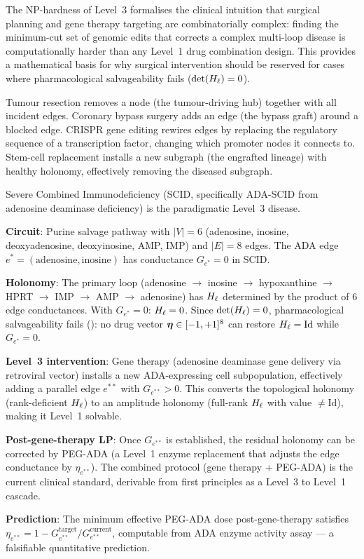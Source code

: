 \begin{remark}
The NP-hardness of Level~3 formalises the clinical intuition that surgical
planning and gene therapy targeting are combinatorially complex: finding the
minimum-cut set of genomic edits that corrects a complex multi-loop disease
is computationally harder than any Level~1 drug combination design.  This
provides a mathematical basis for why surgical intervention should be reserved
for cases where pharmacological salvageability fails ($\det(H_\ell) = 0$).
\end{remark}

\begin{remark}
Tumour resection removes a node (the tumour-driving hub) together with all
incident edges.  Coronary bypass surgery adds an edge (the bypass graft)
around a blocked edge.  CRISPR gene editing rewires edges by replacing the
regulatory sequence of a transcription factor, changing which promoter nodes
it connects to.  Stem-cell replacement installs a new subgraph (the engrafted
lineage) with healthy holonomy, effectively removing the diseased subgraph.
\end{remark}

\begin{example}
\label{ex:scid}
Severe Combined Immunodeficiency (SCID, specifically ADA-SCID from adenosine
deaminase deficiency) is the paradigmatic Level~3 disease.

\textbf{Circuit}: Purine salvage pathway with $|V| = 6$ (adenosine, inosine,
deoxyadenosine, deoxyinosine, AMP, IMP) and $|E| = 8$ edges.  The ADA edge
$e^* = (\mathrm{adenosine, inosine})$ has conductance $G_{e^*} = 0$ in
SCID.

\textbf{Holonomy}: The primary loop
(adenosine $\to$ inosine $\to$ hypoxanthine $\to$ HPRT $\to$ IMP $\to$ AMP
$\to$ adenosine) has $H_\ell$ determined by the product of 6 edge
conductances.  With $G_{e^*} = 0$: $H_\ell = 0$.  Since $\det(H_\ell) = 0$,
pharmacological salvageability fails (): no drug
vector $\boldsymbol{\eta} \in [-1,+1]^8$ can restore $H_\ell = \mathrm{Id}$ while
$G_{e^*} = 0$.

\textbf{Level~3 intervention}: Gene therapy (adenosine deaminase gene
delivery via retroviral vector) installs a new ADA-expressing cell subpopulation,
effectively adding a parallel edge $e^{**}$ with $G_{e^{**}} > 0$.  This
converts the topological holonomy (rank-deficient $H_\ell$) to an amplitude
holonomy (full-rank $H_\ell$ with value $\neq \mathrm{Id}$), making it
Level~1 solvable.

\textbf{Post-gene-therapy LP}: Once $G_{e^{**}}$ is established, the residual
holonomy can be corrected by PEG-ADA (a Level~1 enzyme replacement that
adjusts the edge conductance by $\eta_{e^{**}}$).  The combined protocol
(gene therapy + PEG-ADA) is the current clinical standard, derivable from
first principles as a Level~3 to Level~1 cascade.

\textbf{Prediction}: The minimum effective PEG-ADA dose post-gene-therapy
satisfies $\eta_{e^{**}} = 1 - G_{e^{**}}^{\mathrm{target}} / G_{e^{**}}^{\mathrm{current}}$,
computable from ADA enzyme activity assay — a falsifiable quantitative prediction.
\end{example}

